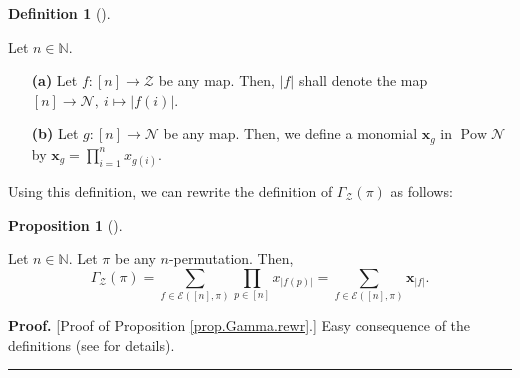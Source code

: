 \documentclass[numbers=enddot,12pt,final,onecolumn,notitlepage]{scrartcl}%
\theoremstyle{definition}
\newtheorem{prop}[theo]{Proposition}
\newenvironment{proposition}[1][]
{\begin{prop}[#1]\begin{leftbar}}
{\end{leftbar}\end{prop}}
\newtheorem{defi}[theo]{Definition}
\newenvironment{definition}[1][]
{\begin{defi}[#1]\begin{leftbar}}
{\end{leftbar}\end{defi}}
\newenvironment{proof}[1][Proof]{\noindent\textbf{#1.} }{\ \rule{0.5em}{0.5em}}
\newenvironment{vershort}{}{}
\let\sumnonlimits\sum
\let\prodnonlimits\prod
\renewcommand{\sum}{\sumnonlimits\limits}
\renewcommand{\prod}{\prodnonlimits\limits}
\begin{document}
\begin{definition}
Let $n\in\mathbb{N}$.

\begin{enumerate}
\item[\textbf{(a)}] Let $f:\left[  n\right]  \rightarrow\mathcal{Z}$ be any
map. Then, $\left\vert f\right\vert $ shall denote the map $\left[  n\right]
\rightarrow\mathcal{N},\ i\mapsto\left\vert f\left(  i\right)  \right\vert $.

\item[\textbf{(b)}] Let $g:\left[  n\right]  \rightarrow\mathcal{N}$ be any
map. Then, we define a monomial $\mathbf{x}_{g}$ in $\operatorname*{Pow}%
\mathcal{N}$ by $\mathbf{x}_{g}=\prod_{i=1}^{n}x_{g\left(  i\right)  }$.
\end{enumerate}
\end{definition}

Using this definition, we can rewrite the definition of $\Gamma_{\mathcal{Z}%
}\left(  \pi\right)  $ as follows:

\begin{proposition}
\label{prop.Gamma.rewr}Let $n\in\mathbb{N}$. Let $\pi$ be any $n$-permutation.
Then,%
\begin{equation}
\Gamma_{\mathcal{Z}}\left(  \pi\right)  =\sum_{f\in\mathcal{E}\left(  \left[
n\right]  ,\pi\right)  }\prod_{p\in\left[  n\right]  }x_{\left\vert f\left(
p\right)  \right\vert }=\sum_{f\in\mathcal{E}\left(  \left[  n\right]
,\pi\right)  }\mathbf{x}_{\left\vert f\right\vert }.\label{eq.Gamma.rewr}%
\end{equation}

\end{proposition}

\begin{vershort}
\begin{proof}
[Proof of Proposition \ref{prop.Gamma.rewr}.] Easy consequence of the
definitions (see \cite{verlong} for details).
\end{proof}
\end{vershort}
\end{document}

